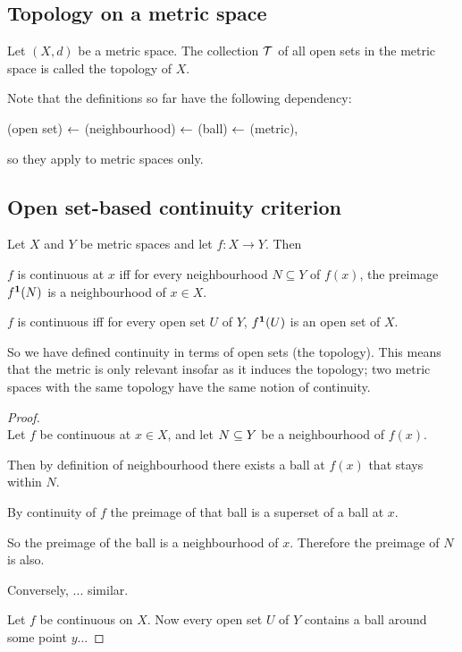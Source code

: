 \subsection{Topology on a metric space}
\begin{definition}
  Let $(X, d)$ be a metric space. The collection $\mathcal T$ of all open sets in the metric space is
  called the topology of $X$.
\end{definition}

\begin{remark*}
  Note that the definitions so far have the following dependency:

  (open set) $\leftarrow$ (neighbourhood) $\leftarrow$ (ball) $\leftarrow$ (metric),

  so they apply to metric spaces only.
\end{remark*}

\subsection{Open set-based continuity criterion}
\begin{theorem}
  Let $X$ and $Y$ be metric spaces and let $f:X \to Y$. Then

  $f$ is continuous at $x$ iff for every neighbourhood $N \subseteq Y$ of $f(x)$, the preimage
  $f^{\mathbf 1}(N)$ is a neighbourhood of $x \in X$.

  $f$ is continuous iff for every open set $U$ of $Y$, $f^{\mathbf 1}(U)$ is an open set of $X$.
\end{theorem}

\begin{remark*}
  So we have defined continuity in terms of open sets (the topology). This means that the metric is
  only relevant insofar as it induces the topology; two metric spaces with the same topology have
  the same notion of continuity.
\end{remark*}

\begin{proof}~\\
  Let $f$ be continuous at $x \in X$, and let $N \subseteq Y$ be a neighbourhood of $f(x)$.

  Then by definition of neighbourhood there exists a ball at $f(x)$ that stays within $N$.

  By continuity of $f$ the preimage of that ball is a superset of a ball at $x$.

  So the preimage of the ball is a neighbourhood of $x$. Therefore the preimage of $N$ is also.

  Conversely, ... similar.

  Let $f$ be continuous on $X$. Now every open set $U$ of $Y$ contains a ball around some point $y$...
\end{proof}

